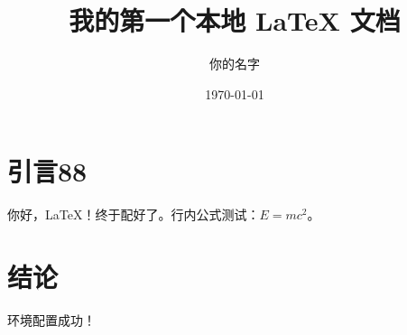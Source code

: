 \documentclass[UTF8]{ctexart}
\title{我的第一个本地 LaTeX 文档}
\author{你的名字}
\date{\today}
\begin{document}
\maketitle

\section{引言88}
你好，LaTeX！终于配好了。行内公式测试：$E=mc^2$。

\section{结论}
环境配置成功！
\end{document}
